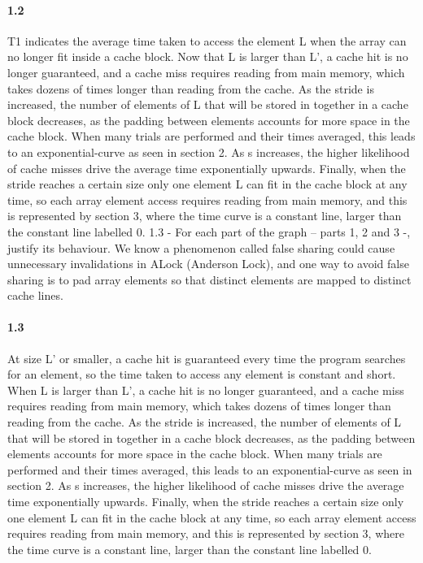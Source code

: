 \documentclass[12pt,letterpaper,titlepage]{article}
\begin{document}
    \paragraph{1.2}
    T1 indicates the average time taken to access the element L when the array can no longer fit inside a cache block. Now that L is larger than L’, a cache hit is no longer guaranteed, and a cache miss requires reading from main memory, which takes dozens of times longer than reading from the cache. As the stride is increased, the number of elements of L that will be stored in together in a cache block decreases, as the padding between elements accounts for more space in the cache block. When many trials are performed and their times averaged, this leads to an exponential-curve as seen in section 2. As s increases, the higher likelihood of cache misses drive the average time exponentially upwards. Finally, when the stride reaches a certain size only one element L can fit in the cache block at any time, so each array element access requires reading from main memory, and this is represented by section 3, where the time curve is a constant line, larger than the constant line labelled 0.
    1.3 - For each part of the graph – parts 1, 2 and 3 -, justify its behaviour. 
    We know a phenomenon called false sharing could cause unnecessary invalidations in ALock (Anderson Lock), and one way to avoid false sharing is to pad array elements so that distinct elements are mapped to distinct cache lines. 
    
    \paragraph{1.3}
    At size L’ or smaller, a cache hit is guaranteed every time the program searches for an element, so the time taken to access any element is constant and short. When L is larger than L’, a cache hit is no longer guaranteed, and a cache miss requires reading from main memory, which takes dozens of times longer than reading from the cache. As the stride is increased, the number of elements of L that will be stored in together in a cache block decreases, as the padding between elements accounts for more space in the cache block. When many trials are performed and their times averaged, this leads to an exponential-curve as seen in section 2. As s increases, the higher likelihood of cache misses drive the average time exponentially upwards. Finally, when the stride reaches a certain size only one element L can fit in the cache block at any time, so each array element access requires reading from main memory, and this is represented by section 3, where the time curve is a constant line, larger than the constant line labelled 0.    
      
\end{document}
